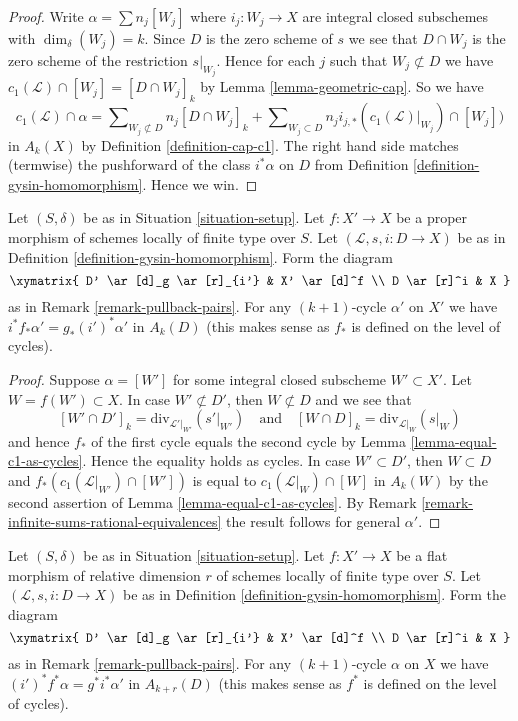 \begin{proof}
Write $\alpha = \sum n_j[W_j]$ where $i_j : W_j \to X$ are integral closed
subschemes with $\dim_\delta(W_j) = k$.
Since $D$ is the zero scheme of $s$ we see that $D \cap W_j$ is the zero scheme
of the restriction $s|_{W_j}$. Hence for each $j$ such that
$W_j \not \subset D$ we have
$c_1(\mathcal{L}) \cap [W_j] = [D \cap W_j]_k$
by Lemma \ref{lemma-geometric-cap}. So we have
$$
c_1(\mathcal{L}) \cap \alpha
=
\sum\nolimits_{W_j \not \subset D} n_j[D \cap W_j]_k
+
\sum\nolimits_{W_j \subset D}
n_j i_{j, *}(c_1(\mathcal{L})|_{W_j}) \cap [W_j])
$$
in $A_k(X)$ by Definition \ref{definition-cap-c1}.
The right hand side matches (termwise) the pushforward of the class
$i^*\alpha$ on $D$ from Definition \ref{definition-gysin-homomorphism}.
Hence we win.
\end{proof}

\begin{lemma}
\label{lemma-closed-in-X-gysin}
Let $(S, \delta)$ be as in Situation \ref{situation-setup}.
Let $f : X' \to X$ be a proper morphism of schemes
locally of finite type over $S$.
Let $(\mathcal{L}, s, i : D \to X)$ be as in
Definition \ref{definition-gysin-homomorphism}.
Form the diagram
$$
\xymatrix{
D' \ar[d]_g \ar[r]_{i'} & X' \ar[d]^f \\
D \ar[r]^i & X
}
$$
as in Remark \ref{remark-pullback-pairs}.
For any $(k + 1)$-cycle $\alpha'$ on $X'$ we have
$i^*f_*\alpha' = g_*(i')^*\alpha'$ in $A_k(D)$
(this makes sense as $f_*$ is defined on the level of cycles).
\end{lemma}

\begin{proof}
Suppose $\alpha = [W']$ for some integral closed subscheme
$W' \subset X'$. Let $W = f(W') \subset X$. In case $W' \not \subset D'$,
then $W \not \subset D$ and we see that
$$
[W' \cap D']_k = \text{div}_{\mathcal{L}'|_{W'}}({s'|_{W'}})
\quad\text{and}\quad
[W \cap D]_k = \text{div}_{\mathcal{L}|_W}(s|_W)
$$
and hence $f_*$ of the first cycle equals the second cycle by
Lemma \ref{lemma-equal-c1-as-cycles}. Hence the
equality holds as cycles. In case $W' \subset D'$, then
$W \subset D$ and $f_*(c_1(\mathcal{L}|_{W'}) \cap [W'])$
is equal to $c_1(\mathcal{L}|_W) \cap [W]$ in $A_k(W)$ by the second
assertion of Lemma \ref{lemma-equal-c1-as-cycles}.
By Remark \ref{remark-infinite-sums-rational-equivalences}
the result follows for general $\alpha'$.
\end{proof}

\begin{lemma}
\label{lemma-gysin-flat-pullback}
Let $(S, \delta)$ be as in Situation \ref{situation-setup}. Let $f : X' \to X$
be a flat morphism of relative dimension $r$ of schemes locally of finite type
over $S$. Let $(\mathcal{L}, s, i : D \to X)$ be as in
Definition \ref{definition-gysin-homomorphism}. Form the diagram
$$
\xymatrix{
D' \ar[d]_g \ar[r]_{i'} & X' \ar[d]^f \\
D \ar[r]^i & X
}
$$
as in Remark \ref{remark-pullback-pairs}.
For any $(k + 1)$-cycle $\alpha$ on $X$ we have
$(i')^*f^*\alpha = g^*i^*\alpha'$ in $A_{k + r}(D)$
(this makes sense as $f^*$ is defined on the level of cycles).
\end{lemma}


